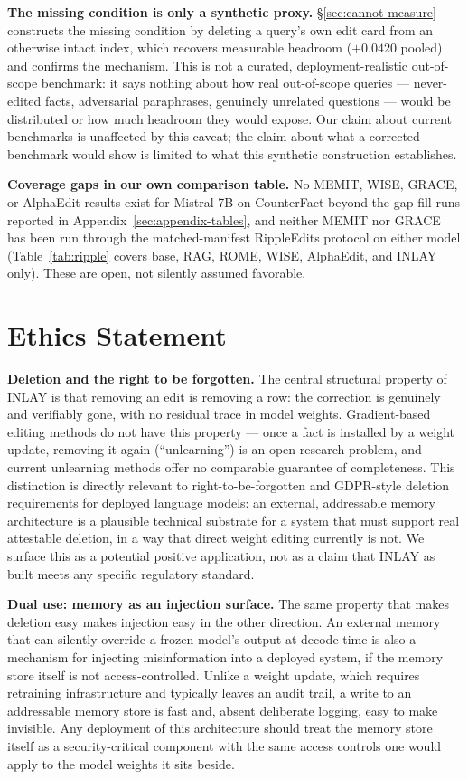 \documentclass[11pt]{article}
\begin{document}
\textbf{The missing condition is only a synthetic proxy.} \S\ref{sec:cannot-measure}
constructs the missing condition by deleting a query's own edit card from an
otherwise intact index, which recovers measurable headroom ($+0.0420$ pooled)
and confirms the mechanism. This is not a curated, deployment-realistic
out-of-scope benchmark: it says nothing about how real out-of-scope
queries --- never-edited facts, adversarial paraphrases, genuinely unrelated
questions --- would be distributed or how much headroom they would expose. Our
claim about current benchmarks is unaffected by this caveat; the claim about
what a corrected benchmark would show is limited to what this synthetic
construction establishes.

\textbf{Coverage gaps in our own comparison table.} No MEMIT, WISE, GRACE, or
AlphaEdit results exist for Mistral-7B on CounterFact beyond the gap-fill
runs reported in Appendix~\ref{sec:appendix-tables}, and neither MEMIT nor
GRACE has been run through the matched-manifest RippleEdits protocol on
either model (Table~\ref{tab:ripple} covers base, RAG, ROME, WISE, AlphaEdit,
and INLAY only). These are open, not silently assumed favorable.

\section*{Ethics Statement}

\textbf{Deletion and the right to be forgotten.} The central structural
property of INLAY is that removing an edit is removing a row: the correction
is genuinely and verifiably gone, with no residual trace in model weights.
Gradient-based editing methods do not have this property --- once a fact is
installed by a weight update, removing it again (``unlearning'') is an open
research problem, and current unlearning methods offer no comparable
guarantee of completeness. This distinction is directly relevant to
right-to-be-forgotten and GDPR-style deletion requirements for deployed
language models: an external, addressable memory architecture is a
plausible technical substrate for a system that must support real
attestable deletion, in a way that direct weight editing currently is not.
We surface this as a potential positive application, not as a claim that
INLAY as built meets any specific regulatory standard.

\textbf{Dual use: memory as an injection surface.} The same property that
makes deletion easy makes injection easy in the other direction. An external
memory that can silently override a frozen model's output at decode time is
also a mechanism for injecting misinformation into a deployed system, if the
memory store itself is not access-controlled. Unlike a weight update, which
requires retraining infrastructure and typically leaves an audit trail, a
write to an addressable memory store is fast and, absent deliberate
logging, easy to make invisible. Any deployment of this architecture should
treat the memory store itself as a security-critical component with the
same access controls one would apply to the model weights it sits beside.
\end{document}
